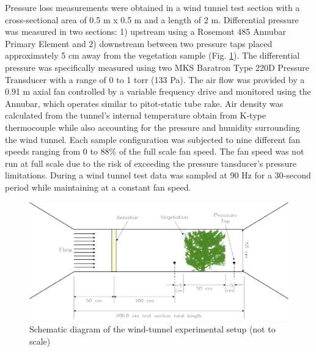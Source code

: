 \documentclass[12pt]{article}
\begin{document}
Pressure loss measurements were obtained in a wind tunnel test section with a cross-sectional area of 0.5 m x 0.5 m and a length of 2 \si{m}. Differential pressure was measured in two sections: 1) upstream using a Rosemont 485 Annubar Primary Element and 2) downstream between two pressure taps placed approximately 5 cm away from the vegetation sample  (Fig. \ref{fig:Windtun}). The differential pressure was specifically measured using two MKS Baratron Type 220D Pressure Transducer with a range of 0 to 1 torr (133 Pa). The air flow was provided by a 0.91 \si{m} axial fan controlled by a variable frequency drive and monitored using the Annubar, which operates similar to pitot-static tube rake. Air density was calculated from the tunnel's internal temperature obtain from K-type thermocouple while also accounting for the pressure and humidity surrounding the wind tunnel. Each sample configuration was subjected to nine different fan speeds ranging from 0 to 88\% of the full scale fan speed. The fan speed was not run at full scale due to the risk of exceeding the pressure tansducer's pressure limitations. During a wind tunnel test data was sampled at 90 Hz for a 30-second period while maintaining at a constant fan speed.\\

\begin{figure} [h]
	\centering 	\includegraphics[width=1.0\linewidth]{Picture6.jpg}
	\caption{Schematic diagram of the wind-tunnel experimental setup (not to scale)}
	\label{fig:Windtun}
\end{figure}
\end{document}
